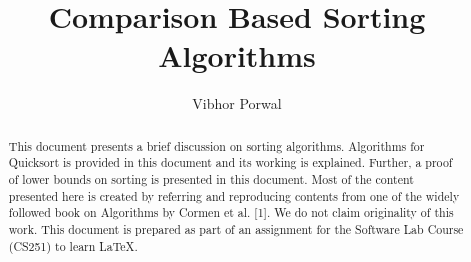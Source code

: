 \documentclass[a4paper, 10pt, twocolumn]{article}
\begin{document}
\title{Comparison Based Sorting Algorithms}
\author{Vibhor Porwal}
\date{}
\maketitle
\newtheorem{theorem}{Theorem}
\begin{abstract}
This document presents a brief discussion on sorting
algorithms. Algorithms for Quicksort is provided
in this document and its working is explained.
Further, a proof of lower bounds on sorting is presented
in this document. Most of the content presented
here is created by referring and reproducing
contents from one of the widely followed book on
Algorithms by Cormen et al. [1]. We do not claim
originality of this work. This document is prepared
as part of an assignment for the Software Lab
Course (CS251) to learn \LaTeX.


\end{abstract}
\end{document}
